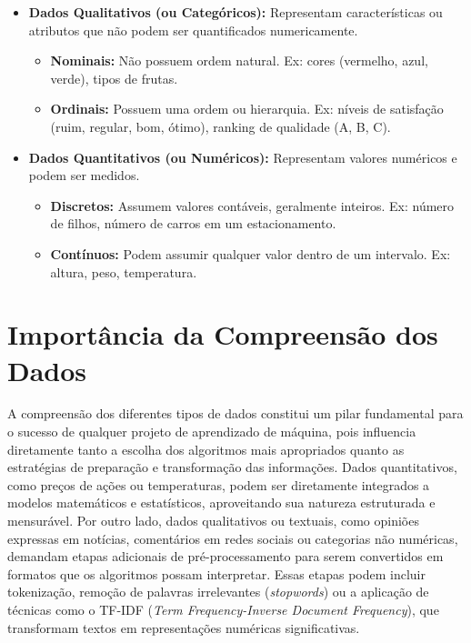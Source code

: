 \documentclass[a4paper,12pt,openany]{book}
\begin{document}
\begin{itemize}
    \item \textbf{Dados Qualitativos (ou Categóricos):} Representam características ou atributos que não podem ser quantificados numericamente.
    \begin{itemize}
        \item \textbf{Nominais:} Não possuem ordem natural. Ex: cores (vermelho, azul, verde), tipos de frutas.
        \item \textbf{Ordinais:} Possuem uma ordem ou hierarquia. Ex: níveis de satisfação (ruim, regular, bom, ótimo), ranking de qualidade (A, B, C).
    \end{itemize}

    \item \textbf{Dados Quantitativos (ou Numéricos):} Representam valores numéricos e podem ser medidos.
    \begin{itemize}
        \item \textbf{Discretos:} Assumem valores contáveis, geralmente inteiros. Ex: número de filhos, número de carros em um estacionamento.
        \item \textbf{Contínuos:} Podem assumir qualquer valor dentro de um intervalo. Ex: altura, peso, temperatura.
    \end{itemize}
\end{itemize}

\section{Importância da Compreensão dos Dados}
A compreensão dos diferentes tipos de dados constitui um pilar fundamental para o sucesso de qualquer projeto de aprendizado de máquina, pois influencia diretamente tanto a escolha dos algoritmos mais apropriados quanto as estratégias de preparação e transformação das informações. Dados quantitativos, como preços de ações ou temperaturas, podem ser diretamente integrados a modelos matemáticos e estatísticos, aproveitando sua natureza estruturada e mensurável. Por outro lado, dados qualitativos ou textuais, como opiniões expressas em notícias, comentários em redes sociais ou categorias não numéricas, demandam etapas adicionais de pré-processamento para serem convertidos em formatos que os algoritmos possam interpretar. Essas etapas podem incluir tokenização, remoção de palavras irrelevantes (\textit{stopwords}) ou a aplicação de técnicas como o TF-IDF (\textit{Term Frequency-Inverse Document Frequency}), que transformam textos em representações numéricas significativas.
\end{document}
